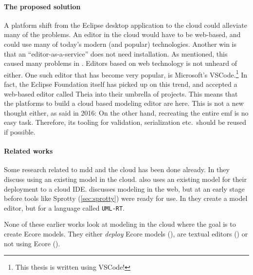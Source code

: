 \paragraph*{The proposed solution}
A platform shift from the \gls{Eclipse} desktop application to the \gls{cloud} could alleviate many of the problems. An editor in the \gls{cloud} would have to be web-based, and could use many of today's modern (and popular) technologies. 
Another win is that an ``editor-as-a-service'' does not need installation.
As mentioned, this caused many problems in \cite{jordicabotFailedConvinceMy2015}. 
Editors based on web technology is not unheard of either. One such editor that has become very popular, is Microsoft's \gls{VSCode}.\footnote{This thesis is written using \gls{VSCode}!}
In fact, the Eclipse Foundation itself has picked up on this trend, and accepted a web-based editor called \gls{Theia} into their umbrella of projects.
This means that the platforms to build a \gls{cloud} based modeling editor are here. 
This is not a new thought either, as \textcite{lajmiModelingBrowserWhat2016} said in 2016: 
On the other hand, recreating the entire \acrlong{emf} is no easy task. Therefore, its tooling for validation, serialization etc.\ should be reused if possible.


\paragraph*{Related works}


Some research related to \gls{mdd} and the \gls{cloud} has been done already.
In \cite{carrascal-manzanaresBuildingMDECloud2015} they discuss using an existing model in the cloud.
\textcite{coulonModularDistributedIDE2020} also uses an existing model for their deployment to a \gls{cloud} \acrshort{IDE}.
\textcite{sainiWebCollaborativeModelling2019} discusses modeling in the web, but at an early stage before tools like Sprotty (\cref{sec:sprotty}) were ready for use.
In \cite{walshClientagnosticHybridModel2020} they create a model editor, but for a language called \texttt{UML-RT}.

None of these earlier works look at modeling in the cloud where the goal is to create \gls{Ecore} models. They either \emph{deploy} \gls{Ecore} models (\cite{carrascal-manzanaresBuildingMDECloud2015,coulonModularDistributedIDE2020}), are textual editors (\cite{coulonModularDistributedIDE2020,sainiWebCollaborativeModelling2019}) or not using \gls{Ecore} (\cite{walshClientagnosticHybridModel2020}).